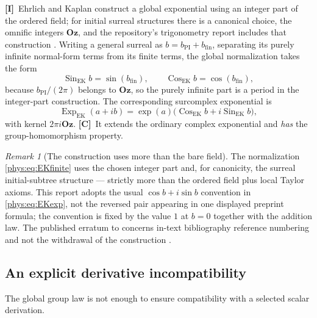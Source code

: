 \documentclass[11pt,letterpaper]{article}
\numberwithin{equation}{section}
\theoremstyle{definition}
\theoremstyle{remark}
\newtheorem{remark}[theorem]{Remark}
\newcommand{\Oz}{\mathbf{Oz}}
\newcommand{\ExpEK}{\operatorname{Exp}_{\mathrm{EK}}}
\newcommand{\sinEK}{\operatorname{Sin}_{\mathrm{EK}}}
\newcommand{\cosEK}{\operatorname{Cos}_{\mathrm{EK}}}
\newcommand{\TC}{\textcolor{TierC}{\textsf{\bfseries[C]}}}
\newcommand{\TI}{\textcolor{TierI}{\textsf{\bfseries[I]}}}
\begin{document}
\TI\ Ehrlich and Kaplan construct a global exponential using an integer part
of the ordered field; for initial surreal structures there is a canonical
choice, the omnific integers $\Oz$, and the repository's trigonometry report
includes that construction \cite{phys:EK,phys:RepoTrig}. Writing a general
surreal as $b=b_{\mathrm{PI}}+b_{\mathrm{fin}}$, separating its purely infinite
normal-form terms from its finite terms, the global normalization takes the
form
\begin{equation}\label{phys:eq:EKfinite}
\sinEK b=\sin(b_{\mathrm{fin}}),\qquad \cosEK b=\cos(b_{\mathrm{fin}}),
\end{equation}
because $b_{\mathrm{PI}}/(2\pi)$ belongs to $\Oz$, so the purely infinite part
is a period in the integer-part construction. The corresponding surcomplex
exponential is
\begin{equation}\label{phys:eq:EKexp}
\ExpEK(a+ib)=\exp(a)\bigl(\cosEK b+i\sinEK b\bigr),
\end{equation}
with kernel $2\pi i\Oz$. \TC\ It extends the ordinary complex exponential and
\emph{has} the group-homomorphism property.

\begin{remark}[The construction uses more than the bare field]
\label{phys:rem:EKinputs}
The normalization \eqref{phys:eq:EKfinite} uses the chosen integer part and,
for canonicity, the surreal initial-subtree structure --- strictly more than
the ordered field plus local Taylor axioms. This report adopts the usual
$\cos b+i\sin b$ convention in \eqref{phys:eq:EKexp}, not the reversed pair
appearing in one displayed preprint formula; the convention is fixed by the
value $1$ at $b=0$ together with the addition law. The published erratum to
\cite{phys:EK} concerns in-text bibliography reference numbering and not the
withdrawal of the construction \cite{phys:EKErratum}.
\end{remark}

\subsection{An explicit derivative incompatibility}
\label{phys:sub:phaseincompat}

The global group law is not enough to ensure compatibility with a selected
scalar derivation.
\end{document}
